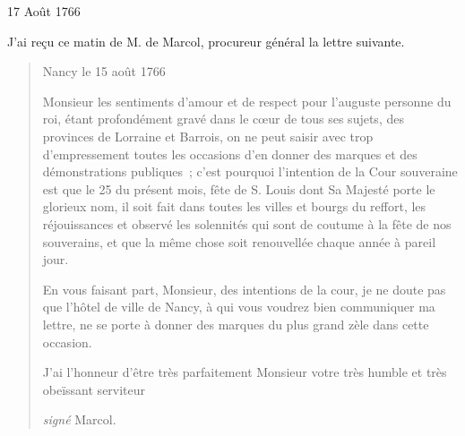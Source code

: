                      \begin{diary}{17 Août 1766}{}
                        
                         J'ai reçu ce matin de M. de Marcol, procureur général
                           la lettre suivante. \bigskip
        
        
                        \begin{quote}\begin{flushright}Nancy
                                 le 15 août 1766\end{flushright}\bigskip
                    
                     Monsieur les sentiments d'amour et de respect
                              pour l'auguste personne du
                                 roi, étant profondément
                              gravé dans le cœur de tous ses sujets, des provinces
                              de Lorraine et Barrois, on ne peut saisir avec trop
                              d'empressement toutes les occasions d'en donner des
                              marques et des démonstrations publiques ; c'est
                              pourquoi l'intention de la Cour
                                 souveraine est que
                              le 25 du présent mois, fête de S.
                              Louis dont Sa Majesté
                              porte le glorieux nom, il soit fait dans toutes les
                              villes et bourgs du reffort, les réjouissances et
                              observé les solennités qui sont de coutume à la
                              fête de nos souverains, et que la même chose soit
                              renouvellée chaque année à pareil jour. \bigskip
        
         En vous faisant part, Monsieur, des intentions
                              de la cour, je ne doute pas que l'hôtel de
                                 ville de
                                 Nancy, à qui vous voudrez bien communiquer ma lettre, ne se porte à donner des marques du
                              plus grand zèle dans cette occasion. \bigskip
        
         J'ai l'honneur d'être très parfaitement
                                 Monsieur votre très humble et très obeïssant
                                 serviteur \begin{flushright}\emph{signé}
                                 Marcol.\end{flushright}\end{quote}
                     \end{diary}

